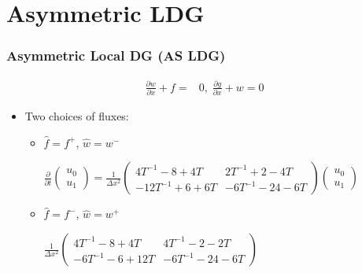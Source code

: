 \documentclass[serif,12pt]{beamer}
\begin{document}
\section{Asymmetric LDG}
\begin{frame}
  \frametitle{Asymmetric Local DG (AS LDG)}
  \begin{align*}
    \frac{\partial w}{\partial x} + f =& 0,\; \frac{\partial g}{\partial x} + w = 0
  \end{align*}
  \begin{itemize}
  \item Two choices of fluxes:
    \begin{itemize}
    \item $\hat{f} = f^+$, $\hat{w} = w^-$\\
      \begin{center}
        $\frac{\partial}{\partial t}\left(\begin{array}{cc}u_0\\u_1
          \end{array}\right) = \frac{1}{\Delta x^2}\left(
          \begin{array}{cc}
            4T^{-1} -8+4 T & 2T^{-1}+2-4 T \\
            -12 T^{-1} +6+6 T & -6 T^{-1} -24-6 T
          \end{array}\right)\left(\begin{array}{c}
            u_0 \\
            u_1 
          \end{array}
        \right)$
      \end{center}
    \item $\hat{f} = f^-$, $\hat{w} = w^+$\\
      \begin{center}
        $\frac{1}{\Delta x^2}\left(
          \begin{array}{cc}
            4T^{-1} -8+4 T & 4T^{-1}-2-2 T \\
            -6 T^{-1} -6+12 T & -6 T^{-1} -24-6 T
          \end{array}
        \right)$
      \end{center}
    \end{itemize}
  \end{itemize}
\end{frame}
\end{document}
